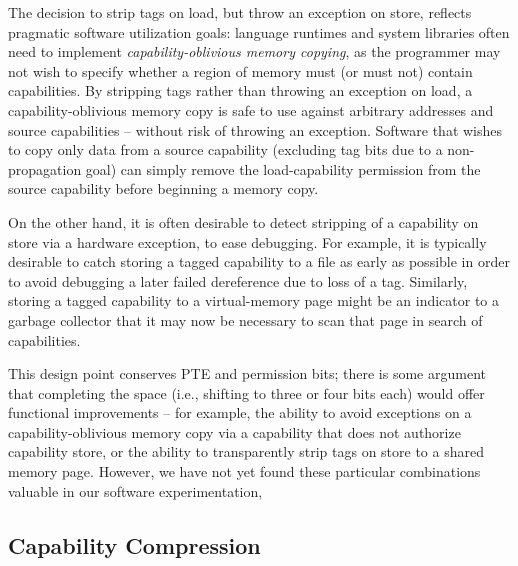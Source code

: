 The decision to strip tags on load, but throw an exception on
store, reflects
pragmatic software utilization goals: language runtimes and system libraries
often need to implement \textit{capability-oblivious memory copying}, as the
programmer may not wish to specify whether a region of memory must (or must
not) contain capabilities.
By stripping tags rather than throwing an exception on load, a
capability-oblivious memory copy is safe to use against arbitrary
addresses and source capabilities -- without risk of throwing an exception.
Software that wishes to copy only data from a source capability (excluding tag
bits due to a non-propagation goal) can simply remove the load-capability
permission from the source capability before beginning a memory copy.

On the other hand, it is often desirable to detect stripping of a capability on
store via a hardware exception, to ease debugging.
For example, it is typically desirable to catch storing a tagged capability to
a file as early as possible in order to avoid debugging a later failed
dereference due to loss of a tag.
Similarly, storing a tagged capability to a virtual-memory page might be an
indicator to a garbage collector that it may now be necessary to scan that
page in search of capabilities.

This design point conserves PTE and permission bits; there is some argument
that completing the space (i.e., shifting to three or four bits
each) would
offer functional improvements -- for example, the ability to avoid exceptions on
a capability-oblivious memory copy via a capability that does not authorize
capability store, or the ability to transparently strip tags on store to a
shared memory page.
However, we have not yet found these particular combinations valuable in our software experimentation, 

\subsection{Capability Compression}
\label{sec:model-compression}


